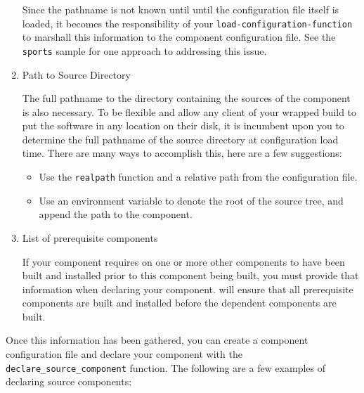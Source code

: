 \begin{enumerate}
  Since the pathname is not known until until the configuration file
  itself is loaded, it becomes the responsibility of your
  \texttt{load-configuration-function} to marshall this information to
  the component configuration file.  See the \texttt{sports} sample
  for one approach to addressing this issue.

\item Path to Source Directory

  The full pathname to the directory containing the sources of the
  component is also necessary.  To be flexible and allow any client of
  your wrapped build to put the software in any location on their
  disk, it is incumbent upon you to determine the full pathname of the
  source directory at configuration load time.  There are many ways to
  accomplish this, here are a few suggestions:

  \begin{itemize}
    \item Use the \gnumake \texttt{realpath} function and a relative path from
      the configuration file.
    \item Use an environment variable to denote the root of the source
      tree, and append the path to the component.
  \end{itemize}

\item List of prerequisite components

  If your component requires on one or more other components to have
  been built and installed prior to this component being built, you
  must provide that information when declaring your component.  \lmsbw
  will ensure that all prerequisite components are built and installed
  before the dependent components are built.
\end{enumerate}

Once this information has been gathered, you can create a component
configuration file and declare your component with the
\texttt{declare\_source\_component} function.  The following are a few
examples of declaring source components:

